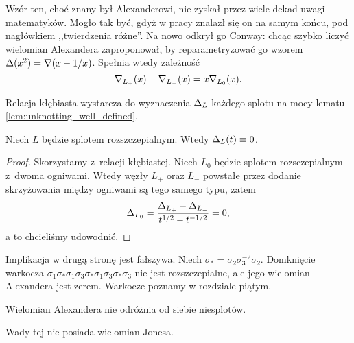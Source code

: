 Wzór ten, choć znany był Alexanderowi, nie zyskał przez wiele dekad uwagi matematyków.
%
Mogło tak być, gdyż w pracy \cite{alexander28} znalazł się on na samym końcu, pod nagłówkiem ,,twierdzenia różne''.
Na nowo odkrył go Conway: chcąc szybko liczyć wielomian Alexandera zaproponował, by reparametryzować go wzorem $\Delta(x^2) = \nabla(x - 1/x)$.
Spełnia wtedy zależność
\begin{equation}
    \nabla_{L_+}(x)- \nabla_{L_-}(x) = x \nabla_{L_0}(x).
\end{equation}

Relacja kłębiasta wystarcza do wyznaczenia $\Delta_L$ każdego splotu na mocy lematu \ref{lem:unknotting_well_defined}.

\begin{proposition}
%
\label{prp:alexander_unlinks}
    Niech $L$ będzie splotem rozszczepialnym.
    Wtedy $\Delta_L(t) \equiv 0$.
\end{proposition}

\begin{proof}
    Skorzystamy z~relacji kłębiastej.
    Niech $L_0$ będzie splotem rozsczepialnym z~dwoma ogniwami.
    Wtedy węzły $L_+$ oraz $L_-$ powstałe przez dodanie skrzyżowania między ogniwami są tego samego typu, zatem
    \begin{equation}
        \Delta_{L_0} = \frac{\Delta_{L_+} - \Delta_{L_-}}{t^{1/2} - t^{-1/2}} = 0,
    \end{equation}
    a to chcieliśmy udowodnić.
\end{proof}

Implikacja w drugą stronę jest fałszywa.
Niech $\sigma_* = \sigma_{2} \sigma_{3}^{-2} \sigma_{2}$.
Domknięcie warkocza $\sigma_{1} \sigma_* \sigma_{1} \sigma_{3} \sigma_* \sigma_{1} \sigma_{3} \sigma_* \sigma_{3}$ nie jest rozszczepialne, ale jego wielomian Alexandera jest zerem.
%
Warkocze poznamy w rozdziale piątym.

\begin{corollary}
    Wielomian Alexandera nie odróżnia od siebie niesplotów.
\end{corollary}

Wady tej nie posiada wielomian Jonesa.


